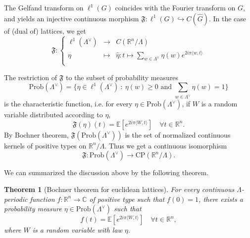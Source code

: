 \documentclass{article}
\newtheorem{theorem}{Theorem}
\begin{document}
The Gelfand transform on $\ell^1(G)$ coincides with the Fourier transform on $G$, and yields an injective continuous morphism $\mathfrak F : \ell^1(G)\hookrightarrow C(\hat G)$. In the case of (dual of) lattices, we get
\[\mathfrak F : \left\{ \begin{array}{rcl}
\ell^1(\Lambda^\vee) & \rightarrow &  C(\mathbb R^n / \Lambda) \\
\eta & \mapsto & \hat \eta : t \mapsto \sum_{w\in \Lambda^\vee} \eta(w) e^{2i\pi \langle w , t\rangle} \\ 
\end{array}\right.\]

The restriction of $\mathfrak F$ to the subset of probability measures
\[\text{Prob}(\Lambda^\vee) =\{\eta\in\ell^1(\Lambda^\vee) \ :\ \eta(w)\geq 0 \text{ and } \sum_{w\in \Lambda^\vee} \eta(w) = 1\}  \]
is the characteristic function, i.e. for every $\eta\in\text{Prob} (\Lambda^\vee)$, if $W$ is a random variable distributed according to $\eta$, 
\[\mathfrak F(\eta)(t) = \mathbb E[e^{2i\pi \langle W , t\rangle } ]\quad\forall t\in \mathbb R^n.\] 
By Bochner theorem, $\mathfrak F(\text{Prob} (\Lambda^\vee))$ is the set of normalized continuous kernels of positive types on $\mathbb R^n / \Lambda$. Thus we get a continuous isomorphism 
\[\mathfrak F : \text{Prob}(\Lambda^\vee ) \rightarrow \text{CP}(\mathbb R^n / \Lambda).\]

We can summarized the discussion above by the following theorem.

\begin{theorem}[Bochner theorem for euclidean lattices]\label{BochnerLattices}
For every continuous $\Lambda$-periodic function $f : \mathbb R^n \rightarrow \mathbb C$ of positive type such that $f(0) = 1$, there exists a probability measure $\eta\in \text{Prob} (\Lambda^\vee)$ such that 
\[f(t) =\mathbb E[e^{2i\pi \langle W , t\rangle } ]\quad\forall t\in \mathbb R^n ,\]
where $W$ is a random variable with law $\eta$.
\end{theorem}
\end{document}
